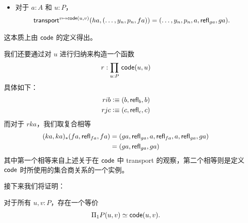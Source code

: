 \begin{itemize}
\item 对于 $a:A$ 和 $u:P$，
  \[ \mathsf{transport}^{v\mapsto \mathsf{code}(u,v)}(ha, (\dots, y_n,p_n,fa))
  = (\dots,y_n,p_n,a,\mathsf{refl}_{ga},ga).
  \]
\end{itemize}


这本质上由 $\mathsf{code}$ 的定义得出。

我们还要通过对 $u$ 进行归纳来构造一个函数
\[ r : \prd{u:P} \code(u,u) \]
具体如下：
\begin{align*}
  rib &\vcentcolon\equiv (b,\mathsf{refl}_{b},b)\\
  rjc &\vcentcolon\equiv (c,\mathsf{refl}_{c},c)
\end{align*}
而对于 $rka$，我们取复合相等
\begin{align*}
  (ka,ka)_* (fa,\mathsf{refl}_{fa},fa)
  &= (ga,\mathsf{refl}_{ga},a,\mathsf{refl}_{fa},a,\mathsf{refl}_{ga},ga) \\
  &= (ga,\mathsf{refl}_{ga},ga)
\end{align*}
其中第一个相等来自上述关于在 $\mathsf{code}$ 中 transport 的观察，第二个相等则是定义 $\mathsf{code}$ 时所使用的集合商关系的一个实例。

接下来我们将证明：


\begin{thm}\label{thm:naive-van-kampen}
  对于所有 $u,v:P$，存在一个等价
  \[ \Pi_1P(u,v) \simeq \mathsf{code}(u,v). \]
\end{thm}

